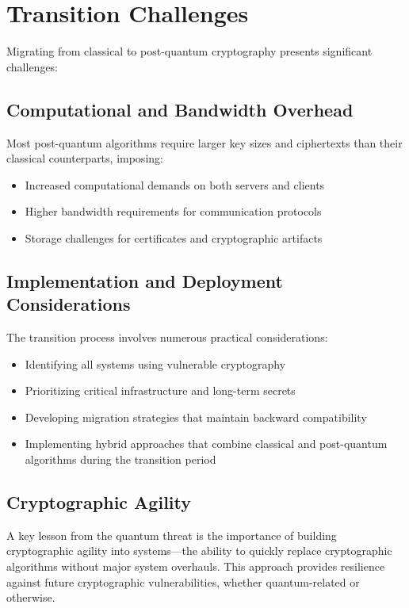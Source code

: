 \section{Transition Challenges}
Migrating from classical to post-quantum cryptography presents significant challenges:

\subsection{Computational and Bandwidth Overhead}
Most post-quantum algorithms require larger key sizes and ciphertexts than their classical counterparts, imposing:
\begin{itemize}
    \item Increased computational demands on both servers and clients
    \item Higher bandwidth requirements for communication protocols
    \item Storage challenges for certificates and cryptographic artifacts
\end{itemize}

\subsection{Implementation and Deployment Considerations}
The transition process involves numerous practical considerations:
\begin{itemize}
    \item Identifying all systems using vulnerable cryptography
    \item Prioritizing critical infrastructure and long-term secrets
    \item Developing migration strategies that maintain backward compatibility
    \item Implementing hybrid approaches that combine classical and post-quantum algorithms during the transition period
\end{itemize}

\subsection{Cryptographic Agility}
A key lesson from the quantum threat is the importance of building cryptographic agility into systems—the ability to quickly replace cryptographic algorithms without major system overhauls. This approach provides resilience against future cryptographic vulnerabilities, whether quantum-related or otherwise.

